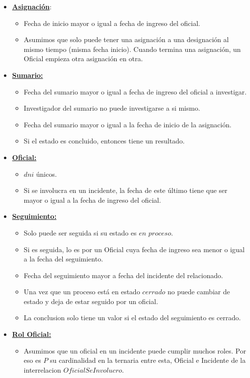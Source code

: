 \begin{itemize}

\item\uline{\textbf{Asignación}}:
\begin{itemize}
\item Fecha de inicio mayor o igual a fecha de ingreso del oficial.
\item Asumimos que solo puede tener una asignación a una designación al mismo tiempo (misma fecha inicio). 
Cuando termina una asignación, un Oficial
empieza otra asignación en otra.
\end{itemize}


\item\uline{\textbf{Sumario:}}
\begin{itemize}
\item Fecha del sumario mayor o igual a fecha de ingreso del oficial a investigar.
\item Investigador del sumario no puede investigarse a si mismo.
\item Fecha del sumario mayor o igual a la fecha de inicio de la asignación.
\item Si el estado es concluido, entonces tiene un resultado. 
\end{itemize}
\item\uline{\textbf{Oficial:}}
\begin{itemize}
\item $dni$ únicos.
\item  Si se involucra en un incidente, la fecha de este último tiene que ser mayor o igual a la fecha de ingreso del oficial.
\end{itemize}
\item\uline{\textbf{Seguimiento:}}
\begin{itemize}
\item Solo puede ser seguida si su estado es $en$ $proceso$.
\item Si es seguida, lo es por un Oficial cuya fecha de ingreso sea menor o igual a la fecha del seguimiento.
\item Fecha del seguimiento mayor a fecha del incidente del relacionado.
\item Una vez que un proceso está en estado $cerrado$ no puede cambiar de estado y deja de estar seguido por un oficial.
\item La conclusion solo tiene un valor si el estado del seguimiento es cerrado.
\end{itemize}
\item\uline{\textbf{Rol Oficial:}}
\begin{itemize}
\item Asumimos que un oficial en un incidente puede cumplir muchos roles. Por eso es $P$ su cardinalidad en la ternaria entre esta, Oficial e Incidente de la interrelacion $OficialSeInvolucro$.
\end{itemize}


\end{itemize}
